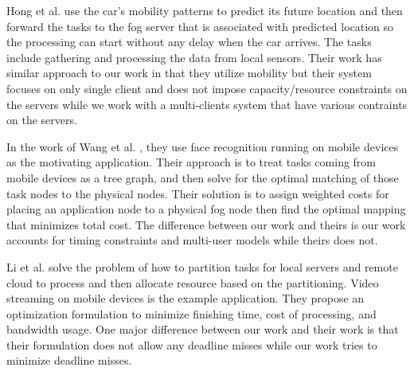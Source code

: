 Hong et al. \cite{oppos} use the car's mobility patterns to predict its future location and then forward the tasks to the fog server that is associated with predicted location so the processing can start without any delay when the car arrives. The tasks include gathering and processing the data from local sensors. Their work has similar approach to our work in that they utilize mobility but their system focuses on only single client and does not impose capacity/resource constraints on the servers while we work with a multi-clients system that have various contraints on the servers. 



In the work of Wang et al. \cite{onlinep}, they use face recognition running on mobile devices as the motivating application. Their approach is to treat tasks coming from mobile devices as a tree graph, and then solve for the optimal matching of those task nodes to the physical nodes. Their solution is to assign weighted costs for placing an application node to a physical fog node then find the optimal mapping that minimizes total cost. The difference between our work and theirs is our work accounts for timing constraints and multi-user models while theirs does not.


Li et al. \cite{energya} solve the problem of how to partition tasks for local servers and remote cloud to process and then allocate resource based on the partitioning. Video streaming on mobile devices is the example application. They propose an optimization formulation to minimize finishing time, cost of processing, and bandwidth usage. One major difference between our work and their work is that their formulation does not allow any deadline misses while our work tries to minimize deadline misses.













